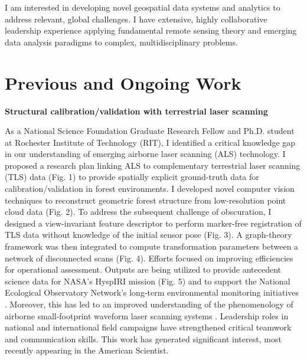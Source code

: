 \documentclass[letterpaper,sans]{moderncv}
\begin{document}
%
\makecvtitle
\vspace{-16mm}
\begin{paracol}{2}
\setlength{\columnsep}{2em}
\begin{leftcolumn}
I am interested in developing novel geospatial data systems and analytics to address relevant, global challenges. I have extensive, highly collaborative leadership experience applying fundamental remote sensing theory and emerging data analysis paradigms to complex, multidisciplinary problems.

\section{Previous and Ongoing Work}

\textbf{Structural calibration/validation with terrestrial laser scanning}

As a National Science Foundation Graduate Research Fellow and Ph.D. student at Rochester Institute of Technology (RIT), I identified a critical knowledge gap in our understanding of emerging airborne laser scanning (ALS) technology. I proposed a research plan linking ALS to complementary terrestrial laser scanning (TLS) data (Fig. 1) to provide spatially explicit ground-truth data for calibration/validation in forest environments. I developed novel computer vision techniques to reconstruct geometric forest structure from low-resolution point cloud data \cite{spie2013dk,kelbe2015stem} (Fig. 2). To address the subsequent challenge of obscuration, I designed a view-invariant feature descriptor to perform marker-free registration of TLS data without knowledge of the initial sensor pose \cite{sl2013dk} (Fig. 3). A graph-theory framework was then integrated to compute transformation parameters between a network of disconnected scans (Fig. 4). Efforts focused on improving efficiencies for operational assessment. Outputs are being utilized to provide antecedent science data for NASA's HyspIRI mission \cite{spie2015wy} (Fig. 5) and to support the National Ecological Observatory Network's long-term environmental monitoring initiatives \cite{igarss2014jv}. Moreover, this has led to an improved understanding of the phenomenology of airborne small-footprint waveform laser scanning systems \cite{asprs2013kc-a,cjrs2013pr}. Leadership roles in national and international field campaigns have strengthened critical teamwork and communication skills. This work has generated significant interest, most recently appearing in the American Scientist. 
\vspace{.2cm}


\end{leftcolumn}
\end{paracol}
\end{document}

